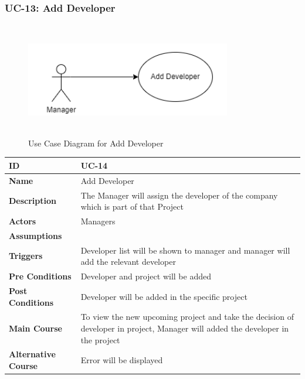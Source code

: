     \subsubsection{UC-13: Add Developer}
    \begin{figure}[H]
        \includegraphics[height=5cm, width=0.8\textwidth]{./diagrams/Use Case/u13.png}
        \centering 
        \caption{Use Case Diagram for Add Developer}
        \label{fig:Usecase1}
        \end{figure}
        
    \begin{center}
        \begin{tabularx}{\textwidth}{|l|X|}
            \hline
            \textbf{ID} & UC-14 \\
            \hline
            \textbf{Name} & Add Developer \\
            \hline
            \textbf{Description} & The Manager will assign the developer of the company which is part of that Project \\
            \hline
            \textbf{Actors} & Managers \\
            \hline
            \textbf{Assumptions} &  \\
            \hline
            \textbf{Triggers} & Developer list will be shown to manager and manager will add the relevant developer \\
            \hline
            \textbf{Pre Conditions} & Developer and project will be added \\
            \hline
            \textbf{Post Conditions} & Developer will be added in the specific project \\
            \hline
            \textbf{Main Course} & To view the new upcoming project and take the decision of developer in project, Manager will added the developer in the project \\
            \hline
            \textbf{Alternative Course} & Error will be displayed \\
            \hline
            
        \end{tabularx}
    \end{center}
    
